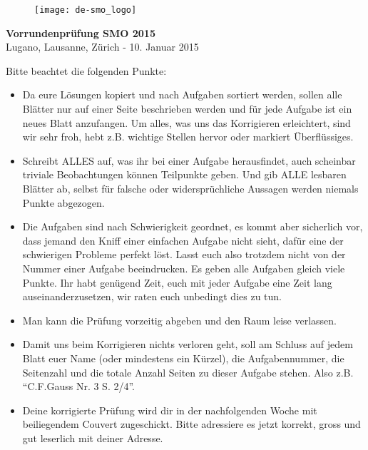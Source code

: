\documentclass[12pt,a4paper]{article}
\begin{document}
\thispagestyle{empty}
\begin{figure}[h]
\texttt{[image: de-smo\_logo]}
\end{figure}

\vspace{1cm}

\begin{center}
\Huge{\textbf{Vorrundenprüfung SMO 2015}}\\[1.5cm]
\large{Lugano, Lausanne, Zürich - 10. Januar 2015}\\[3.5cm]
\end{center}


Bitte beachtet die folgenden Punkte:

\begin{itemize}
\item Da eure Lösungen kopiert und nach Aufgaben sortiert werden, sollen alle Blätter nur auf einer Seite beschrieben werden und für jede Aufgabe ist ein neues Blatt anzufangen. Um alles, was uns das Korrigieren erleichtert, sind wir sehr froh, hebt z.B. wichtige Stellen hervor oder markiert Überflüssiges.

\item Schreibt ALLES auf, was ihr bei einer Aufgabe herausfindet, auch scheinbar triviale Beobachtungen können Teilpunkte geben. Und gib ALLE lesbaren Blätter ab, selbst für falsche oder widersprüchliche Aussagen werden niemals Punkte abgezogen.

\item Die Aufgaben sind nach Schwierigkeit geordnet, es kommt aber sicherlich vor, dass jemand den Kniff einer einfachen Aufgabe nicht sieht, dafür eine der schwierigen Probleme perfekt löst. Lasst euch also trotzdem nicht von der Nummer einer Aufgabe beeindrucken. Es geben alle Aufgaben gleich viele Punkte. Ihr habt genügend Zeit, euch mit jeder Aufgabe eine Zeit lang auseinanderzusetzen, wir raten euch unbedingt dies zu tun.

\item Man kann die Prüfung vorzeitig abgeben und den Raum leise verlassen.

\item Damit uns beim Korrigieren nichts verloren geht, soll am Schluss auf jedem Blatt euer Name (oder mindestens ein Kürzel), die Aufgabennummer, die Seitenzahl und die totale Anzahl Seiten zu dieser Aufgabe stehen. Also z.B. "`C.F.Gauss Nr. 3 S. 2/4"'.

\item Deine korrigierte Prüfung wird dir in der nachfolgenden Woche mit beiliegendem Couvert zugeschickt. Bitte adressiere es jetzt korrekt, gross und gut leserlich mit deiner Adresse.
\end{itemize}
\end{document}
